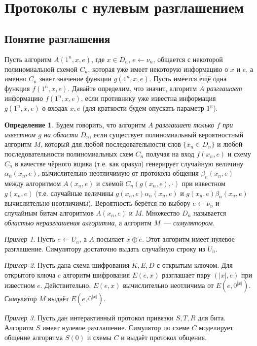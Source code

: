 \documentclass[12pt,a4paper]{article}
\theoremstyle{definition}
\newtheorem{definition}{Определение}[section]
\theoremstyle{plain}
\theoremstyle{remark}
\newtheorem{example}{Пример}[section]
\begin{document}
\section{Протоколы с нулевым разглашением}
\subsection{Понятие разглашения}
Пусть алгоритм $A(1^n, x, e)$, где $x\in D_n$, $e\gets\nu_n$, 
общается с некоторой полиномиальной схемой $C_n$,
которая уже имеет некоторую информацию о $x$ и $e$, а именно $C_n$ знает
значение функции $g(1^n,x,e)$. Пусть имеется ещё одна функция $f(1^n,x,e)$.
Давайте определим, что значит, алгоритм $A$ \emph{разглашает} информацию $f(1^n,x,e)$,
если противнику уже известна информация $g(1^n,x,e)$ о входах $x,e$ 
(для краткости будем опускать параметр $1^n$).
\begin{definition}
Будем говорить, что алгоритм $A$ \emph{разглашает только $f$ при известном $g$ на области $D_n$},
если существует полиномиальный вероятностный алгоритм $M$, который для любой последовательности 
слов $\{x_n\in D_n\}$ и любой последовательности полиномиальных схем $C_n$
получая на вход $f(x_n,e)$ и схему $C_n$ в качестве чёрного ящика
(т.е. как оракул) генерирует случайную величину $\alpha_n(x_n, e)$,
вычислительно неотличимую от протокола общения $\beta_n(x_n, e)$ между алгоритмом $A(x_n, e)$
и схемой $C_n(g(x_n,e), \cdot)$ при известном $g(x_n,e)$ (т.е. случайные величины 
$g(x_n,e)\alpha_n(x_n, e)$ и $g(x_n,e)\beta_n(x_n, e)$ вычислительно неотличимы). Вероятность
берётся по выбору $e\gets\nu_n$ и случайным битам алгоритмов $A(x_n,e)$ и $M$.
Множество $D_n$ называется \emph{областью неразглашения алгоритма}, а алгоритм $M$~--- \emph{симулятором}.

\end{definition}
\begin{example}
Пусть $e\gets U_n$, а $A$ посылает $x\oplus e$. 
Этот алгоритм имеет нулевое разглашение. 
Симулятору достаточно выдать случайную строку из $U_n$.
\end{example}
\begin{example}
Пусть дана схема шифрования $K,E,D$ с открытым ключом. 
Для открытого ключа $e$ алгоритм шифрования $E(e,x)$ разглашает
пару $(|x|, e)$ при известном $e$. Действительно, $E(e,x)$
вычислительно неотличима от $E(e,0^{|x|})$. 
Симулятор $M$ выдаёт $E(e,0^{|x|})$.
\end{example}
\begin{example}
Пусть дан интерактивный протокол привязки $S,T,R$ для бита.
Алгоритм $S$ имеет нулевое разглашение.
Симулятор по схеме $C$ моделирует общение алгоритма $S(0)$
и схемы $C$ и выдаёт протокол общения.
\end{example}
\end{document}
